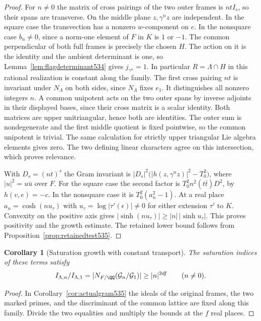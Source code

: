 \documentclass[a4paper,11pt]{article}
\newtheorem{corollary}[proposition]{Corollary}
\theoremstyle{definition}
\theoremstyle{remark}
\numberwithin{equation}{section}
\begin{document}
\begin{proof}
For \(n\ne0\) the matrix of cross pairings of the two outer
frames is \(ntI_s\), so their spans are transverse. On the
middle plane \(z,\gamma^nz\) are independent. In the square
case the transvection has a nonzero \(w\)-component on \(e\).
In the nonsquare case \(b_n\ne0\), since a norm-one element of
\(F\) in \(K\) is \(1\) or \(-1\). The common perpendicular
of both full frames is precisely the chosen \(H\). The action
on it is the identity and the ambient determinant is one, so
Lemma~\ref{lem:flagdeterminant534} gives \(j_{\gamma^n}=1\).
In particular \(R=\Lambda\cap H\) in this rational realization
is constant along the family.
The first cross pairing \(nt\) is invariant under \(N_\Lambda\)
on both sides, since \(N_\Lambda\) fixes \(e_1\). It distinguishes
all nonzero integers \(n\). A common unipotent acts on the two
outer spans by inverse adjoints in their displayed bases, since
their cross matrix is a scalar identity. Both matrices are upper
unitriangular, hence both are identities. The outer sum is
nondegenerate and the first middle quotient is fixed pointwise,
so the common unipotent is trivial. The same calculation for
strictly upper triangular Lie algebra elements gives zero.
The two defining linear characters agree on this intersection,
which proves relevance.

With \(D_s=(nt)^s\) the Gram invariant is
\(|D_s|^2\bigl(|h(z,\gamma^n z)|^2-T_0^2\bigr)\), where
\(|u|^2=u\bar u\) over \(F\). For the square case the second
factor is \(T_0^2 n^2(t\bar t)D^2\), by \(h(v,e)=-c\).
In the nonsquare case it is \(T_0^2(a_n^2-1)\).
At a real place \(a_n=\cosh(nu_\tau)\) with
\(u_\tau=\log|\tau'(\epsilon)|\ne0\) for either extension
\(\tau'\) to \(K\). Convexity on the positive axis gives
\(|\sinh(nu_\tau)|\ge |n|\,|\sinh u_\tau|\).
This proves positivity and the growth estimate. The retained
lower bound follows from Proposition~\ref{prop:retainedtest535}.
\end{proof}

\begin{corollary}[Saturation growth with constant transport]
\leavevmode\label{cor:saturationseries536}
The saturation indices of these terms satisfy
\[
        I_{\Lambda,n}/I_{\Lambda,1}
          =|N_{F/\QQ}(\mathcal G_n/\mathcal G_1)|
          \ge |n|^{2df}\qquad(n\ne0).
\]
\end{corollary}
\begin{proof}
In Corollary~\ref{cor:actualgram535} the ideals of the original
frames, the two marked primes, and the discriminant of the
common lattice are fixed along this family. Divide the two
equalities and multiply the bounds at the \(f\) real places.
\end{proof}
\end{document}
